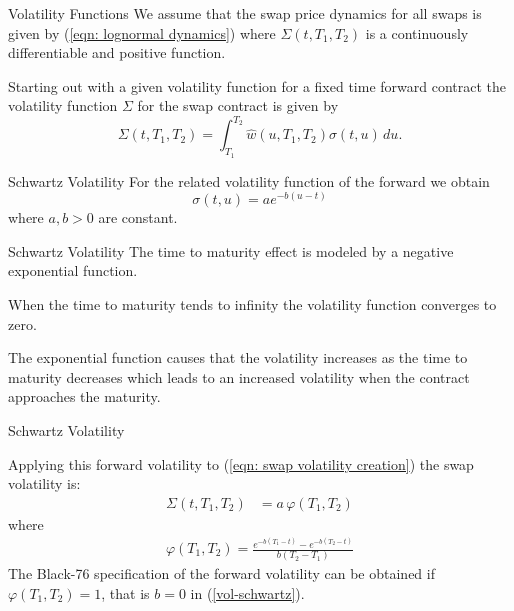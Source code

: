 






{Volatility Functions}
We assume that the swap price dynamics for all swaps is given by (\ref{eqn: lognormal dynamics})
where $\Sigma(t,T_1,T_2)$ is a continuously differentiable and positive function.

Starting out with a given volatility function for a fixed time forward contract the volatility function $\Sigma$ for the swap contract is given by
\begin{equation}
\Sigma(t,T_1,T_2)=\int_{T_1}^{T_2} \hat{w}(u,T_1,T_2) \sigma(t,u) \, du. \label{eqn: swap volatility creation}
\end{equation}



{Schwartz Volatility}
For the related volatility function of the forward we obtain
\begin{equation}\label{vol-schwartz}
\sigma(t,u)=a e^{-b(u-t)}
\end{equation}
where $a,b >0 $ are constant.



{Schwartz Volatility}
The time to maturity effect is modeled by a negative exponential function.






	When the time to maturity tends to infinity the volatility function converges to zero.


	The exponential function causes that the volatility increases as the time to maturity decreases which leads to an increased volatility when the contract approaches the maturity.









{Schwartz Volatility}

Applying this forward volatility to (\ref{eqn: swap volatility creation}) the swap volatility is:
\begin{align}
\Sigma(t,T_1,T_2)&=a\,\varphi(T_1,T_2)
\end{align}
where
\begin{align}
\varphi(T_1,T_2)= \frac{e^{-b(T_1-t)}-e^{-b(T_2-t)}}{b(T_2-T_1)}
\label{volatility function varphi}
\end{align}
The Black-76 specification of the forward volatility can be obtained if $\varphi(T_1,T_2) =1$, that is $b=0$
in (\ref{vol-schwartz}).

